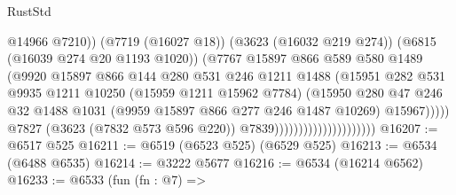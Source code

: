 \begin{lexlean}{RustStd}
\begin{coremodule}
                                                    @14966
                                                    @7210))
                                                (@7719 (@16027 @18))
                                                (@3623 (@16032 @219 @274))
                                                (@6815 (@16039 @274 @20 @1193 @1020))
                                                (@7767
                                                  @15897
                                                  @866
                                                  @589
                                                  @580
                                                  @1489
                                                  (@9920
                                                    @15897
                                                    @866
                                                    @144
                                                    @280
                                                    @531
                                                    @246
                                                    @1211
                                                    @1488
                                                    (@15951
                                                      @282
                                                      @531
                                                      @9935
                                                      @1211
                                                      @10250
                                                      (@15959 @1211 @15962 @7784)
                                                      (@15950
                                                        @280
                                                        @47
                                                        @246
                                                        @32
                                                        @1488
                                                        @1031
                                                        (@9959 @15897 @866 @277 @246 @1487 @10269)
                                                        @15967)))))
                                              @7827
                                              (@3623 (@7832 @573 @596 @220))
                                              @7839)))))))))))))))))))))
@16207 := @6517 @525
@16211 := @6519 (@6523 @525) (@6529 @525)
@16213 := @6534 (@6488 @6535)
@16214 := @3222 @5677
@16216 := @6534 (@16214 @6562)
@16233 := @6533
    (fun (fn : @7) =>

\end{coremodule}
\end{lexlean}
